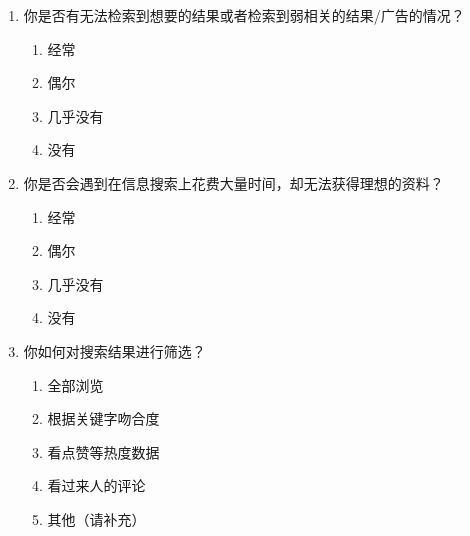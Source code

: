 \begin{enumerate}[leftmargin=*]
    \item 你是否有无法检索到想要的结果或者检索到弱相关的结果/广告的情况？
      \begin{enumerate}[label=\Alph*., itemsep=0pt]
        \item 经常
        \item 偶尔
        \item 几乎没有
        \item 没有
      \end{enumerate}

    \item 你是否会遇到在信息搜索上花费大量时间，却无法获得理想的资料？
      \begin{enumerate}[label=\Alph*., itemsep=0pt]
        \item 经常
        \item 偶尔
        \item 几乎没有
        \item 没有
      \end{enumerate}

    \item 你如何对搜索结果进行筛选？
      \begin{enumerate}[label=\Alph*., itemsep=0pt]
        \item 全部浏览
        \item 根据关键字吻合度
        \item 看点赞等热度数据
        \item 看过来人的评论
        \item 其他（请补充）
      \end{enumerate}

  \end{enumerate}
